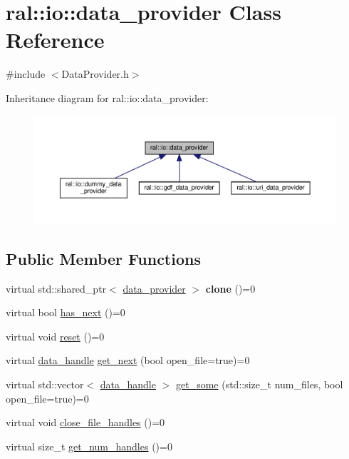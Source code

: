 \hypertarget{classral_1_1io_1_1data__provider}{}\section{ral\+:\+:io\+:\+:data\+\_\+provider Class Reference}
\label{classral_1_1io_1_1data__provider}


{\ttfamily \#include $<$Data\+Provider.\+h$>$}



Inheritance diagram for ral\+:\+:io\+:\+:data\+\_\+provider\+:\nopagebreak
\begin{figure}[H]
\begin{center}
\leavevmode
\includegraphics[width=350pt]{classral_1_1io_1_1data__provider__inherit__graph}
\end{center}
\end{figure}
\subsection*{Public Member Functions}
\begin{DoxyCompactItemize}
\item 
\mbox{\label{classral_1_1io_1_1data__provider_afff64b38ec3107e2e63edf6773ab7414}} 
virtual std\+::shared\+\_\+ptr$<$ \hyperlink{classral_1_1io_1_1data__provider}{data\+\_\+provider} $>$ {\bfseries clone} ()=0
\item 
virtual bool \hyperlink{classral_1_1io_1_1data__provider_a92176228bbef65093853e2e2165a6d71}{has\+\_\+next} ()=0
\item 
virtual void \hyperlink{classral_1_1io_1_1data__provider_ab762cbdb9fd702a61b48785c84e91536}{reset} ()=0
\item 
virtual \hyperlink{structral_1_1io_1_1data__handle}{data\+\_\+handle} \hyperlink{classral_1_1io_1_1data__provider_aa49cde8c92f3bc4e9fcbe2e8f34e7ba3}{get\+\_\+next} (bool open\+\_\+file=true)=0
\item 
virtual std\+::vector$<$ \hyperlink{structral_1_1io_1_1data__handle}{data\+\_\+handle} $>$ \hyperlink{classral_1_1io_1_1data__provider_ae65c935f9812ac3321b0c814fa4a5548}{get\+\_\+some} (std\+::size\+\_\+t num\+\_\+files, bool open\+\_\+file=true)=0
\item 
virtual void \hyperlink{classral_1_1io_1_1data__provider_afa6216bccde854b011ed098e114ba8b3}{close\+\_\+file\+\_\+handles} ()=0
\item 
virtual size\+\_\+t \hyperlink{classral_1_1io_1_1data__provider_a00ff9cc629a869d7b7e6a67c90056749}{get\+\_\+num\+\_\+handles} ()=0
\end{DoxyCompactItemize}



